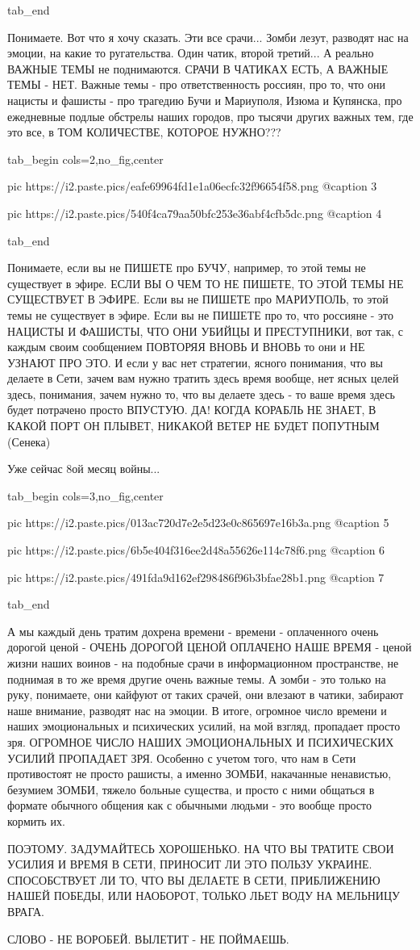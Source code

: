   tab_end
\fi

Понимаете. Вот что я хочу сказать. Эти все срачи... Зомби лезут, разводят нас
на эмоции, на какие то ругательства. Один чатик, второй третий... А реально
ВАЖНЫЕ ТЕМЫ не поднимаются. СРАЧИ В ЧАТИКАХ ЕСТЬ, А ВАЖНЫЕ ТЕМЫ - НЕТ. Важные
темы - про ответственность россиян, про то, что они нацисты и фашисты - про
трагедию Бучи и Мариуполя, Изюма и Купянска, про ежедневные подлые обстрелы
наших городов, про тысячи других важных тем, где это все, в ТОМ КОЛИЧЕСТВЕ,
КОТОРОЕ НУЖНО??? 

\ifcmt
  tab_begin cols=2,no_fig,center

     pic https://i2.paste.pics/eafe69964fd1e1a06ecfc32f96654f58.png
		 @caption 3

		 pic https://i2.paste.pics/540f4ca79aa50bfc253e36abf4cfb5dc.png
		 @caption 4

  tab_end
\fi

Понимаете, если вы не ПИШЕТЕ про БУЧУ, например, то этой темы не существует в
эфире. ЕСЛИ ВЫ О ЧЕМ ТО НЕ ПИШЕТЕ, ТО ЭТОЙ ТЕМЫ НЕ СУЩЕСТВУЕТ В ЭФИРЕ. Если вы
не ПИШЕТЕ про МАРИУПОЛЬ, то этой темы не существует в эфире. Если вы не ПИШЕТЕ
про то, что россияне - это НАЦИСТЫ И ФАШИСТЫ, ЧТО ОНИ УБИЙЦЫ И ПРЕСТУПНИКИ, вот
так, с каждым своим сообщением ПОВТОРЯЯ ВНОВЬ И ВНОВЬ то они и НЕ УЗНАЮТ ПРО
ЭТО. И если у вас нет стратегии, ясного понимания, что вы делаете в Сети, зачем
вам нужно тратить здесь время вообще, нет ясных целей здесь, понимания, зачем
нужно то, что вы делаете здесь - то ваше время здесь будет потрачено просто
ВПУСТУЮ. ДА! КОГДА КОРАБЛЬ НЕ ЗНАЕТ, В КАКОЙ ПОРТ ОН ПЛЫВЕТ, НИКАКОЙ ВЕТЕР НЕ
БУДЕТ ПОПУТНЫМ (Сенека)

Уже сейчас 8ой месяц войны...

\ifcmt
  tab_begin cols=3,no_fig,center

     pic https://i2.paste.pics/013ac720d7e2e5d23e0c865697e16b3a.png
		 @caption 5

		 pic https://i2.paste.pics/6b5e404f316ee2d48a55626e114c78f6.png
		 @caption 6
		 
		 pic https://i2.paste.pics/491fda9d162ef298486f96b3bfae28b1.png
		 @caption 7

  tab_end
\fi

А мы каждый день тратим дохрена времени - времени - оплаченного очень дорогой
ценой - ОЧЕНЬ ДОРОГОЙ ЦЕНОЙ ОПЛАЧЕНО НАШЕ ВРЕМЯ - ценой жизни наших воинов - на
подобные срачи в информационном пространстве, не поднимая в то же время другие
очень важные темы. А зомби - это только на руку, понимаете, они кайфуют от
таких срачей, они влезают в чатики, забирают наше внимание, разводят нас на
эмоции. В итоге, огромное число времени и наших эмоциональных и психических
усилий, на мой взгляд, пропадает просто зря. ОГРОМНОЕ ЧИСЛО НАШИХ ЭМОЦИОНАЛЬНЫХ
И ПСИХИЧЕСКИХ УСИЛИЙ ПРОПАДАЕТ ЗРЯ. Особенно с учетом того, что нам в Сети
противостоят не просто рашисты, а именно ЗОМБИ, накачанные ненавистью, безумием
ЗОМБИ, тяжело больные существа, и просто с ними общаться в формате обычного
общения как с обычными людьми - это вообще просто кормить их.

ПОЭТОМУ. ЗАДУМАЙТЕСЬ ХОРОШЕНЬКО. НА ЧТО ВЫ ТРАТИТЕ СВОИ УСИЛИЯ И ВРЕМЯ В СЕТИ,
ПРИНОСИТ ЛИ ЭТО ПОЛЬЗУ УКРАИНЕ. СПОСОБСТВУЕТ ЛИ ТО, ЧТО ВЫ ДЕЛАЕТЕ В СЕТИ,
ПРИБЛИЖЕНИЮ НАШЕЙ ПОБЕДЫ, ИЛИ НАОБОРОТ, ТОЛЬКО ЛЬЕТ ВОДУ НА МЕЛЬНИЦУ ВРАГА. 

СЛОВО - НЕ ВОРОБЕЙ. ВЫЛЕТИТ - НЕ ПОЙМАЕШЬ.
